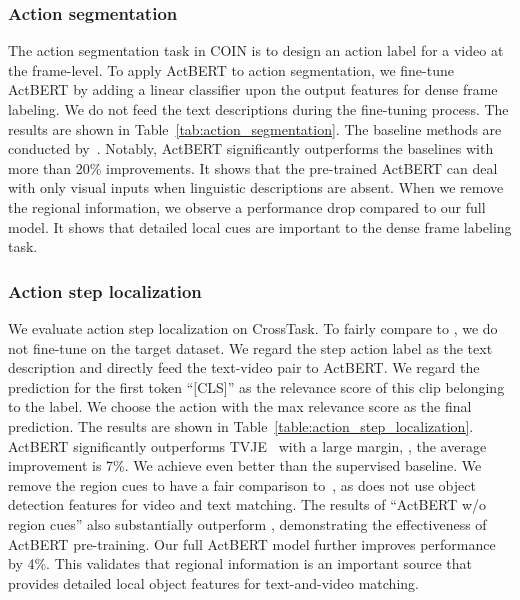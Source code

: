 \documentclass[10pt,twocolumn,letterpaper]{article}
\newcommand{\ours}{ActBERT\xspace}
\begin{document}
\subsubsection{Action segmentation}
The action segmentation task in COIN is to design an action label for a video at the frame-level.
To apply \ours to action segmentation, we fine-tune \ours by adding a linear classifier upon the output features for dense frame labeling. 
We do not feed the text descriptions during the fine-tuning process.
The results are shown in Table~\ref{tab:action_segmentation}. The baseline methods are conducted by~\cite{tang2019coin}. 
Notably, \ours significantly outperforms the baselines with more than 20\% improvements. It shows that the pre-trained \ours can deal with only visual inputs when linguistic descriptions are absent. When we remove the regional information, we observe a performance drop compared to our full model. It shows that  detailed local cues are important to the dense frame labeling task.


\subsubsection{Action step localization}
\label{sec:action_step_localization}
We evaluate action step localization on CrossTask.
To fairly compare to \cite{miech2019howto100m}, we do not fine-tune on the target dataset.
We regard the step action label as the text description and directly feed the text-video pair to \ours.
We regard the prediction for the first token ``[CLS]'' as the relevance score of this clip belonging to the label. We choose the action with the max relevance score as the final prediction.
The results are shown in Table~\ref{table:action_step_localization}.
\ours significantly outperforms TVJE~\cite{miech2019howto100m} with a large margin, \ie, the average improvement is 7\%. We achieve even better than the supervised baseline. We remove the region cues to have a fair comparison to~\cite{miech2019howto100m}, as \cite{miech2019howto100m} does not use object detection features for video and text matching. The results of ``\ours w/o region cues'' also substantially outperform \cite{miech2019howto100m}, demonstrating the effectiveness of \ours pre-training. Our full \ours model further improves performance by 4\%. This validates that regional information is an important source that provides detailed  local object features for text-and-video matching.
\end{document}

